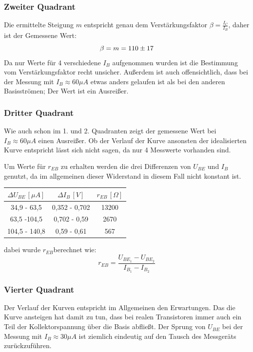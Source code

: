 \subsubsection{Zweiter Quadrant}
Die ermittelte Steigung \(m\) entspricht genau dem Verstärkungsfaktor \(\beta = \frac{I_C}{I_B}\), daher ist der Gemessene Wert:
\begin{equation}
\beta = m = 110 \pm 17 \notag
\end{equation}
Da nur Werte für 4 verschiedene \(I_{B}\) aufgenommen wurden ist die Bestimmung vom Verstärkungsfaktor recht unsicher. Außerdem ist auch offensichtlich, dass bei der Messung mit \(I_B \approx 60 \mu A\) etwas anders gelaufen ist als bei den anderen Basisströmen; Der Wert ist ein Ausreißer.
\subsubsection{Dritter Quadrant}
Wie auch schon im 1. und 2. Quadranten zeigt der gemessene Wert bei \(I_B \approx 60 \mu A\) einen Ausreißer. Ob der Verlauf der Kurve ansonsten der idealisierten Kurve entspricht lässt sich nicht sagen, da nur 4 Messwerte vorhanden sind.  

Um Werte für \(r_{EB}\) zu erhalten werden die drei Differenzen von \(U_{BE}\) und \(I_{B}\) genutzt, da im allgemeinen dieser Widerstand in diesem Fall nicht konstant ist.
\begin{center}
\begin{tabular}{c|c|c}
\(\Delta U_{BE}\, [\mu A]\) & \(\Delta I_B\, [V]\) &  \(r_{EB}\, [\Omega]\) \\\hline
34,9 - 63,5 & 0,352 - 0,702 & 13200\\
63,5 -104,5 & 0,702 - 0,59 & 2670\\
104,5 - 140,8 & 0,59 - 0,61 & 567
\end{tabular}
\end{center}
dabei wurde \(r_{EB}\)berechnet wie:
\begin{equation}
r_{EB} = \frac{U_{BE_1}-U_{BE_2}}{I_{B_1}-I_{B_2}}
\end{equation}

\subsubsection{Vierter Quadrant}
Der Verlauf der Kurven entspricht im Allgemeinen den Erwartungen. Das die Kurve ansteigen hat damit zu tun, dass bei realen Transistoren immer auch ein Teil der Kollektorspannung über die Basis abfließt. Der Sprung von \(U_{BE}\) bei der Messung mit \(I_B \approx 30 \mu A\) ist ziemlich eindeutig auf den Tausch des Messgeräts zurückzuführen.

